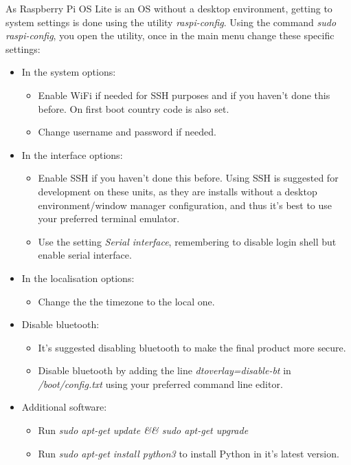 \documentclass[a4paper,11pt]{scrartcl}
\begin{document}
As Raspberry Pi OS Lite is an OS without a desktop environment, getting to system settings is done using the utility \textit{raspi-config}. 
Using the command \textit{sudo raspi-config}, you open the utility, once in the main menu change these specific settings:
\begin{itemize}   
    \item In the system options:
    \begin{itemize}
        \item Enable WiFi if needed for SSH purposes and if you haven't done this before. On first boot country code is also set.
        \item Change username and password if needed.
    \end{itemize}
    \item In the interface options:
    \begin{itemize}
        \item Enable SSH if you haven't done this before. Using SSH is suggested for development on these units, as they are installs without a desktop environment/window manager configuration, and thus it's best to use your preferred terminal emulator.
        \item Use the setting \textit{Serial interface}, remembering to disable login shell but enable serial interface.
    \end{itemize}
    \item In the localisation options:
        \begin{itemize}
            \item Change the the timezone to the local one.
        \end{itemize}
    \item Disable bluetooth:
    \begin{itemize}
        \item It's suggested disabling bluetooth to make the final product more secure.
        \item Disable bluetooth by adding the line \textit{dtoverlay=disable-bt} in \textit{/boot/config.txt} using your preferred command line editor.
    \end{itemize}
    \item Additional software:
    \begin{itemize}
        \item Run \textit{sudo apt-get update \&\& sudo apt-get upgrade}
        \item Run \textit{sudo apt-get install python3} to install Python in it's latest version.

\end{itemize}
\end{itemize}
\end{document}
